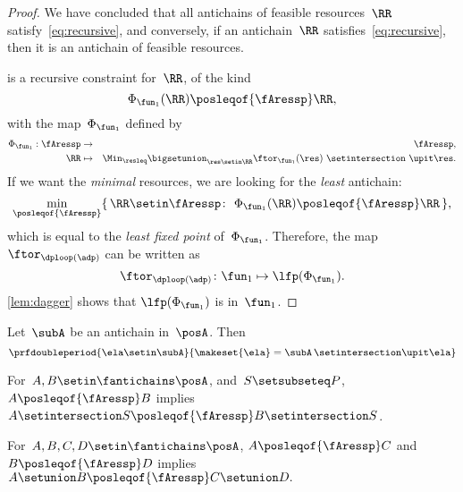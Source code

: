 \begin{proof}
    We have concluded that all antichains of feasible resources~$\RR$ satisfy~\cref{eq:recursive}, and conversely, if an antichain~$\RR$ satisfies~\cref{eq:recursive}, then it is an antichain of feasible resources.

     is a recursive constraint for~$\RR$, of the kind
    \begin{equation*}
        \Phi_{\fun_{1}}(\RR)\posleqof{\fAressp}\RR,
    \end{equation*}
    with the map~$\Phi_{\fun_{1}}$ defined by
    \begin{eqnarray}
        \Phi_{\fun_{1}}:\fAressp & \to     & \fAressp,\label{eq:bigphi} \\
        \RR                      & \mapsto & \Min_{\resleq}\bigsetunion_{\res\setin\RR}\ftor_{\fun_{1}}(\res)\ \setintersection\ \upit\res.\nonumber
    \end{eqnarray}
    If we want the \emph{minimal} resources, we are looking for the \emph{least} antichain:
    \begin{equation*}
        \min_{\posleqof{\fAressp}}\{\,\RR\setin\fAressp\colon\ \Phi_{\fun_{1}}(\RR)\posleqof{\fAressp}\RR\,\},
    \end{equation*}
    which is equal to the \emph{least fixed point }of~$\Phi_{\fun_{1}}$.
    Therefore, the map $\ftor_{\dploop(\adp)}$ can be written as
    \begin{equation}
        \ftor_{\dploop(\adp)}\colon\fun_{1}\mapsto\lfp(\Phi_{\fun_{1}}).
        \label{eq:loop_fixpoint}
    \end{equation}
    \cref{lem:dagger} shows that $\lfp(\Phi_{\fun_{1}})$ is \scottcontinuous in~$\fun_{1}$.
\end{proof}
\begin{lemma}
    \label{lem:antichain-write}
    Let~$\subA$ be an antichain in~$\posA$.
    Then
    \begin{equation*}
        \prfdoubleperiod{
            \ela\setin \subA
        }{
            \makeset{\ela}=\subA\,\setintersection\upit \ela
        }
    \end{equation*}
\end{lemma}

\begin{lemma}
    \label{lem:antichain_inter}
    For~$A,B\setin\fantichains\posA$, and~$S\setsubseteq P$,
    $A\posleqof{\fAressp}B$ implies $A\setintersection S\posleqof{\fAressp}B\setintersection S$.
\end{lemma}

\begin{lemma}
    \label{lem:antichain_union}
    For~$A,B,C,D\setin\fantichains\posA$, $A\posleqof{\fAressp}C$
    and $B\posleqof{\fAressp}D$ implies $A\setunion B\posleqof{\fAressp}C\setunion D.
    $
\end{lemma}

